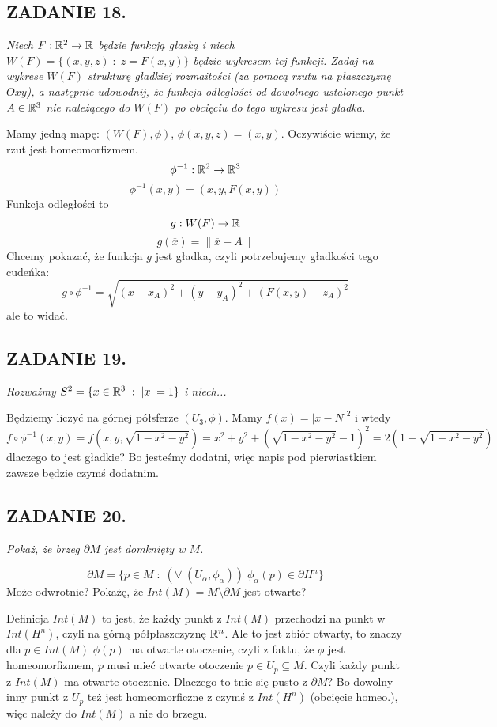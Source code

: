 \documentclass{article}
\begin{document}
\subsection*{ZADANIE 18.}
\emph{\color{pink}Niech $F:\mathbb{R}^2\to\mathbb{R}$ będzie funkcją głaską i niech $W(F)=\{(x, y,z)\;:\;z=F(x,y)\}$ będzie wykresem tej funkcji. Zadaj na wykrese $W(F)$ strukturę gładkiej rozmaitości (za pomocą rzutu na płaszczyznę $Oxy$), a następnie udowodnij, że funkcja odległości od dowolnego ustalonego punkt $A\in\mathbb{R}^3$ nie należącego do $W(F)$ po obcięciu do tego wykresu jest gładka.}
\smallskip

Mamy jedną mapę: $(W(F),\phi)$, $\phi(x,y,z)=(x,y)$. Oczywiście wiemy, że rzut jest homeomorfizmem.
$$\phi^{-1}:\mathbb{R}^2\to \mathbb{R}^3$$
$$\phi^{-1}(x,y)=(x,y,F(x,y))$$
Funkcja odległości to
$$g:W(F)\to\mathbb{R}$$
$$g(\overline x)=\|\overline x-A\|$$
Chcemy pokazać, że funkcja $g$ jest gładka, czyli potrzebujemy gładkości tego cudeńka:
$$g\circ \phi^{-1}=\sqrt{(x-x_A)^2+(y-y_A)^2+(F(x,y)-z_A)^2}$$
ale to widać.

\subsection*{ZADANIE 19.}
\emph{\color{pink}Rozważmy $S^2=\{x\in\mathbb{R}^3\;:\;|x|=1\}$ i niech...}
\smallskip

Będziemy liczyć na górnej półsferze $(U_3,\phi)$. Mamy $f(x)=|x-N|^2$ i wtedy
$$f\circ\phi^{-1}(x, y)=f(x, y, \sqrt{1-x^2-y^2})=x^2+y^2+(\sqrt{1-x^2-y^2}-1)^2=2(1-\sqrt{1-x^2-y^2})$$
dlaczego to jest gładkie? Bo jesteśmy dodatni, więc napis pod pierwiastkiem zawsze będzie czymś dodatnim.

\subsection*{ZADANIE 20.}
\emph{\color{pink}Pokaż, że brzeg $\partial M$ jest domknięty w $M$.}
\smallskip

$$\partial M=\{p\in M\;:\;(\forall\;(U_\alpha, \phi_\alpha))\;\phi_\alpha(p)\in\partial H^n\}$$
Może odwrotnie? Pokażę, że $Int(M)=M\setminus\partial M$ jest otwarte?

Definicja $Int(M)$ to jest, że każdy punkt z $Int(M)$ przechodzi na punkt w $Int(H^n)$, czyli na górną półpłaszczyznę $\mathbb{R}^n$. Ale to jest zbiór otwarty, to znaczy dla $p\in Int(M)$ $\phi(p)$ ma otwarte otoczenie, czyli z faktu, że $\phi$ jest homeomorfizmem, $p$ musi mieć otwarte otoczenie $p\in U_p\subseteq M$. Czyli każdy punkt z $Int(M)$ ma otwarte otoczenie. Dlaczego to tnie się pusto z $\partial M$? Bo dowolny inny punkt z $U_p$ też jest homeomorficzne z czymś z $Int(H^n)$ (obcięcie homeo.), więc należy do $Int(M)$ a nie do brzegu.
\end{document}
